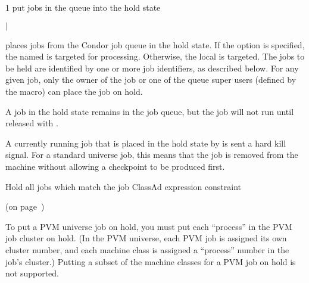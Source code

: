 \begin{ManPage}{\label{man-condor-hold}}{1}
{put jobs in the queue into the hold state}
\Synopsis {}
\ToolArgsBase

\ToolLocate 
\ToolJobs
$|$  \Dots 

\ToolLocate 
\ToolAll


\Description

 places jobs from the Condor job queue in
the hold state.
If the  option is specified, the named  is targeted
for processing.  
Otherwise, the local  is targeted.
The jobs to be held are identified by one or more job identifiers, as
described below.
For any given job, only the owner of the job or one of the queue super users
(defined by the  macro) can place the job on hold.

A job in the hold state remains in the job queue,
but the job will not run until released with .

A currently running job that is placed in the hold state by 
is sent a hard kill signal.
For a standard universe job,
this means that the job is removed from the machine without
allowing a checkpoint to be produced first.

\begin{Options}

	\ToolArgsBaseDesc
	\ToolLocateDesc
         {Hold all jobs which match
	        the job ClassAd expression constraint}

\end{Options}

\SeeAlso
{} (on page~\pageref{man-condor-release})

\GenRem

To put a PVM universe job on hold, you must put each ``process'' in
the PVM job cluster on hold.  (In the PVM universe, each PVM job is
assigned its own cluster number, and each machine class is assigned a
``process'' number in the job's cluster.)  Putting a subset of the
machine classes for a PVM job on hold is not supported.


\end{ManPage}
